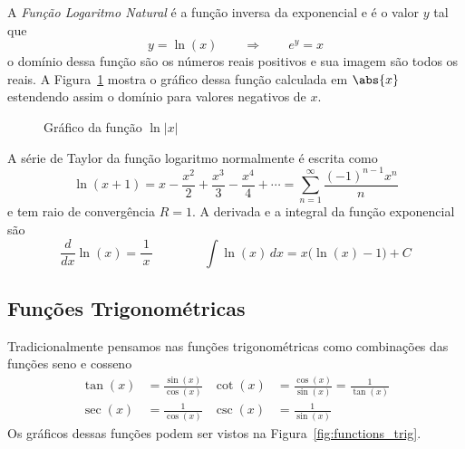 A \emph{Função Logaritmo Natural}
é a função inversa da exponencial e é o valor $y$ tal que
\[
  y = \ln(x) \qquad\Rightarrow\qquad e^y = x
\]
o domínio dessa função são os números reais positivos e sua imagem são todos os reais.
A Figura~\ref{fig:functions_log} mostra o gráfico dessa função calculada em
$\abs{x}$ estendendo assim o domínio para valores negativos de $x$.


\begin{figure}
  \centering
  
  \caption{Gráfico da função $\ln|x|$}
  \label{fig:functions_log}
\end{figure}

A série de Taylor da função logaritmo normalmente é escrita como
\[
  \ln(x+1)
  = x - \frac{x^2}{2}
  + \frac{x^3}{3}
  - \frac{x^4}{4}
  + \cdots
  = \sum_{n=1}^{\infty} \frac{(-1)^{n-1}x^n}{n}
\]
e tem raio de convergência $R=1$.
A derivada e a integral da função exponencial são
\[
  \frac{d}{dx} \ln(x) = \frac{1}{\,x\,}
  \qquad\qquad
  \int \ln(x)\,dx = x\big( \ln(x) - 1 \big) + C
\]

\subsection*{Funções Trigonométricas}

Tradicionalmente pensamos nas funções trigonométricas como combinações
das funções seno e cosseno
\begin{align*}
	\tan(x) & = \frac{\sin(x)}{\cos(x)} &
	\cot(x) & = \frac{\cos(x)}{\sin(x)} = \frac{1}{\tan(x)}\\[5mm]
	\sec(x) & = \frac{1}{\cos(x)}       &
	\csc(x) & = \frac{1}{\sin(x)}
\end{align*}
Os gráficos dessas funções podem ser vistos na Figura~\ref{fig:functions_trig}.


